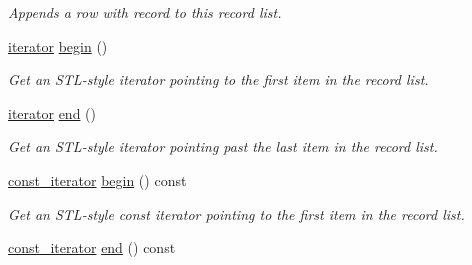 \begin{DoxyCompactItemize}
\begin{DoxyCompactList}\small\item\em Appends a row with {\itshape record} to this record list. \end{DoxyCompactList}\item 
\hyperlink{class_mdt_1_1_plain_text_1_1_record_list_template_a5b0caae56b05a38e53539cad1da8cd12}{iterator} \hyperlink{class_mdt_1_1_plain_text_1_1_record_list_template_af4f42b3785c7ddbbafd9bf3c15ead7d4}{begin} ()\hypertarget{class_mdt_1_1_plain_text_1_1_record_list_template_af4f42b3785c7ddbbafd9bf3c15ead7d4}{}\label{class_mdt_1_1_plain_text_1_1_record_list_template_af4f42b3785c7ddbbafd9bf3c15ead7d4}

\begin{DoxyCompactList}\small\item\em Get an S\+T\+L-\/style iterator pointing to the first item in the record list. \end{DoxyCompactList}\item 
\hyperlink{class_mdt_1_1_plain_text_1_1_record_list_template_a5b0caae56b05a38e53539cad1da8cd12}{iterator} \hyperlink{class_mdt_1_1_plain_text_1_1_record_list_template_accf34cd248a894d4af04510312bbdf23}{end} ()\hypertarget{class_mdt_1_1_plain_text_1_1_record_list_template_accf34cd248a894d4af04510312bbdf23}{}\label{class_mdt_1_1_plain_text_1_1_record_list_template_accf34cd248a894d4af04510312bbdf23}

\begin{DoxyCompactList}\small\item\em Get an S\+T\+L-\/style iterator pointing past the last item in the record list. \end{DoxyCompactList}\item 
\hyperlink{class_mdt_1_1_plain_text_1_1_record_list_template_abfba36291fe9cb605ec432ed873ce4ea}{const\+\_\+iterator} \hyperlink{class_mdt_1_1_plain_text_1_1_record_list_template_a2811685c9280d271f83bcff058658533}{begin} () const \hypertarget{class_mdt_1_1_plain_text_1_1_record_list_template_a2811685c9280d271f83bcff058658533}{}\label{class_mdt_1_1_plain_text_1_1_record_list_template_a2811685c9280d271f83bcff058658533}

\begin{DoxyCompactList}\small\item\em Get an S\+T\+L-\/style const iterator pointing to the first item in the record list. \end{DoxyCompactList}\item 
\hyperlink{class_mdt_1_1_plain_text_1_1_record_list_template_abfba36291fe9cb605ec432ed873ce4ea}{const\+\_\+iterator} \hyperlink{class_mdt_1_1_plain_text_1_1_record_list_template_abaa79756cbf4ff040525344c03871f58}{end} () const \hypertarget{class_mdt_1_1_plain_text_1_1_record_list_template_abaa79756cbf4ff040525344c03871f58}{}\label{class_mdt_1_1_plain_text_1_1_record_list_template_abaa79756cbf4ff040525344c03871f58}


\end{DoxyCompactItemize}
